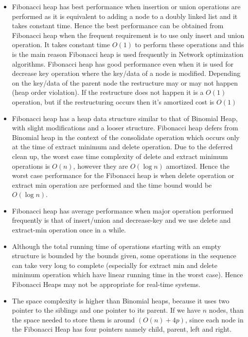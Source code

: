 \begin{itemize}
	\item Fibonacci heap has best performance when insertion or union operations are performed as it is equivalent to adding a node to a doubly linked list and it takes constant time. Hence the best performance can be obtained from Fibonacci heap when the frequent requirement is to use only insert and union operation. It takes constant time $O(1)$ to perform these operations and this is the main reason Fibonacci heap is used frequently in Network optimization algorithms. Fibonacci heap has good performance even when it is used for decrease key operation where the key/data of a node is modified. Depending on the key/data of the parent node the restructure may or may not happen (heap order violation). If the restructure does not happen it is a $O(1)$ operation, but if the restructuring occurs then it's amortized cost is $O(1)$
	\item Fibonacci heap has a heap data structure similar to that of Binomial Heap, with slight modifications and a looser structure. Fibonacci heap defers from Binomial heap in the context of the consolidate operation which occurs only at the time of extract minimum and delete operation. Due to the deferred clean up, the worst case time complexity of delete and extract minimum operations is $O(n)$, however they are $O(\log{n})$ amortized. Hence the worst case performance for the Fibonacci heap is when delete operation or extract min operation are performed and the time bound would be $O(\log{n})$. 
	\item Fibonacci heap has average performance when major operation performed frequently is that of insert/union and decrease-key and we use delete and extract-min operation once in a while.
	\item Although the total running time of operations starting with an empty structure is bounded by the bounds given, some operations in the sequence can take very long to complete (especially for extract min and delete minimum operation which have linear running time in the worst case). Hence Fibonacci Heaps may not be appropriate for real-time systems.
	\item The space complexity is higher than Binomial heaps, because it uses two pointer to the siblings and one pointer to its parent. If we have $n$ nodes, than the space needed to store them is around $(O(n) + 4p )$, since each node in the Fibonacci Heap has four pointers namely child, parent, left and right. 
\end{itemize} 


